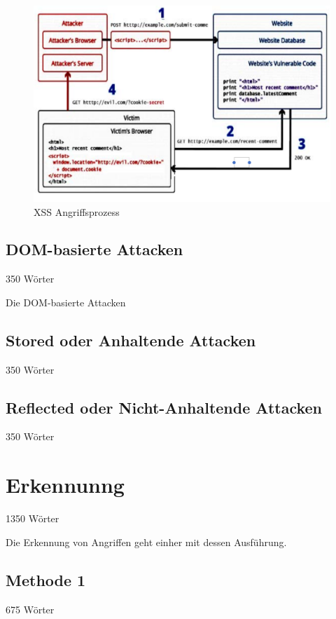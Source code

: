 \begin{figure}[ht]
	\centering
	\includegraphics[width=0.75\linewidth]{images/XSS-attack-process.png}
	\caption{XSS Angriffsprozess}
\end{figure}





\subsection{DOM-basierte Attacken}
\label{subsection:DOM-based Attacks} 350 Wörter

Die DOM-basierte Attacken

\subsection{Stored oder Anhaltende Attacken}
\label{subsection:stored attacks} 350 Wörter


\subsection{Reflected oder Nicht-Anhaltende Attacken}
\label{subsection:reflective attacks} 350 Wörter


\section{Erkennunng}
\label{section:Detection} 1350 Wörter

Die Erkennung von Angriffen geht einher mit dessen Ausführung.

\subsection{Methode 1}
\label{subsection:Method1} 675 Wörter

